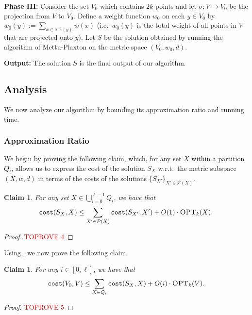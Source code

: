\documentclass[11pt]{article}
\newcommand{\1}{\mathmybb{1}}
\newtheorem{claim}[theorem]{Claim}
\newcommand{\OPT}{\textsc{OPT}}
\newcommand{\cost}{\textnormal{\texttt{cost}}}
\begin{document}
\medskip
\noindent
\textbf{Phase III:} Consider the set $V_0$
which contains $2k$ points and let $\sigma : V \longrightarrow V_0$ be the projection from $V$ to $V_0$. Define a weight function $w_0$ on each $y \in V_0$ by $w_0(y) := \sum_{x \in \sigma^{-1}(y)} w(x)$ (i.e.~$w_0(y)$ is the total weight of all points in $V$ that are projected onto $y$). Let $S$ be the solution obtained by running the algorithm of Mettu-Plaxton \cite{MettuP00} on the metric space $(V_0, w_0, d)$.

\medskip
\noindent
\textbf{Output:}
The solution $S$ is the final output of our algorithm.

\subsection{Analysis}\label{sec:anal:ouralg}

We now analyze our algorithm by bounding its approximation ratio and running time.

\subsubsection*{Approximation Ratio}

We begin by proving the following claim, which, for any set $X$ within a partition $Q_i$, allows us to express the cost of the solution $S_X$ w.r.t.~the metric subspace $(X,w,d)$ in terms of the costs of the solutions $\{S_{X'}\}_{X' \in \mathcal P(X)}$. 

\begin{claim}\label{lem:apx:1}
For any set $X \in \bigcup_{i=0}^{\ell - 1} Q_i$, we have that
$$ \cost(S_X, X) \leq \sum_{X' \in \mathcal P(X)} \cost(S_{X'}, X') + O(1) \cdot \OPT_k(X). $$
\end{claim}

\begin{proof}\textcolor{red}{TOPROVE 4}\end{proof}

Using , we now prove the following claim.

\begin{claim}\label{lem:apx:2}
For any $i \in [0, \ell]$, we have that
$$ \cost(V_0, V) \leq \sum_{X \in Q_i} \cost(S_{X}, X) + O(i) \cdot \OPT_k(V). $$
\end{claim}

\begin{proof}\textcolor{red}{TOPROVE 5}\end{proof}
\end{document}
